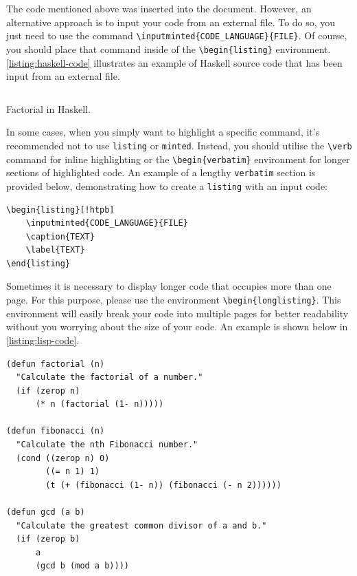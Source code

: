 {The code mentioned above was inserted into the document. However, an alternative approach is to input your code from an external file. To do so, you just need to use the command \verb|\inputminted{CODE_LANGUAGE}{FILE}|. Of course, you should place that command inside of the \verb|\begin{listing}| environment. \autoref{listing:haskell-code} illustrates an example of Haskell source code that has been input from an external file.

\begin{listing}[!htpb]
\inputminted{haskell}{Code/Factorial.hs}
\caption{Factorial in Haskell.}
\label{listing:haskell-code}
\end{listing}

In some cases, when you simply want to highlight a specific command, it's recommended not to use \verb|listing| or \verb|minted|. Instead, you should utilise the \verb|\verb| command for inline highlighting or the \verb|\begin{verbatim}| environment for longer sections of highlighted code. An example of a lengthy \verb|verbatim| section is provided below, demonstrating how to create a \verb|listing| with an input code:

\begin{verbatim}
\begin{listing}[!htpb]
    \inputminted{CODE_LANGUAGE}{FILE}
    \caption{TEXT}
    \label{TEXT}
\end{listing}
\end{verbatim}

Sometimes it is necessary to display longer code that occupies more than one page. For this purpose, please use the environment \verb|\begin{longlisting}|. This environment will easily break your code into multiple pages for better readability without you worrying about the size of your code. An example is shown below in \autoref{listing:lisp-code}.

\begin{longlisting}
\begin{verbatim}
(defun factorial (n)
  "Calculate the factorial of a number."
  (if (zerop n)
      (* n (factorial (1- n)))))

(defun fibonacci (n)
  "Calculate the nth Fibonacci number."
  (cond ((zerop n) 0)
        ((= n 1) 1)
        (t (+ (fibonacci (1- n)) (fibonacci (- n 2))))))

(defun gcd (a b)
  "Calculate the greatest common divisor of a and b."
  (if (zerop b)
      a
      (gcd b (mod a b))))


\end{verbatim}
\end{longlisting}}
